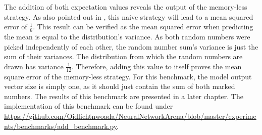 \documentclass[draft,final]{vutinfth} %
\begin{document}
    The addition of both expectation values reveals the output of the memory-less strategy.
    As also pointed out in \cite[p. 6]{UnitaryRNNs}, this naive strategy will lead to a mean squared error of $\frac{1}{6}$.
    This result can be verified as the mean squared error when predicting the mean is equal to the distribution's variance.
    As both random numbers were picked independently of each other, the random number sum's variance is just the sum of their variances.
    The distribution from which the random numbers are drawn has variance $\frac{1}{12}$.
    Therefore, adding this value to itself proves the mean square error of the memory-less strategy.
    For this benchmark, the model output vector size is simply one, as it should just contain the sum of both marked numbers.
    The results of this benchmark are presented in a later chapter.
    The implementation of this benchmark can be found under \url{https://github.com/Oidlichtnwoada/NeuralNetworkArena/blob/master/experiments/benchmarks/add_benchmark.py}.
\end{document}

